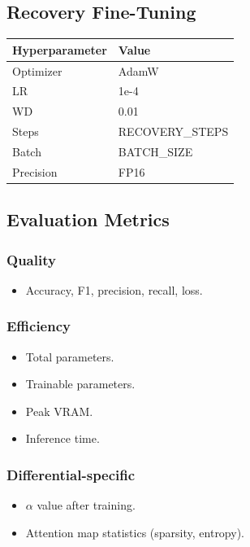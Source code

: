 \subsection{Recovery Fine-Tuning}

\begin{table}[H]
\centering
\small
\begin{tabular}{ll}
\toprule
\textbf{Hyperparameter} & \textbf{Value} \\
\midrule
Optimizer & AdamW \\
LR & 1e-4 \\
WD & 0.01 \\
Steps & {{RECOVERY\_STEPS}} \\
Batch & {{BATCH\_SIZE}} \\
Precision & FP16 \\
\bottomrule
\end{tabular}
\end{table}

\subsection{Evaluation Metrics}

\subsubsection{Quality}
\begin{itemize}
\item Accuracy, F1, precision, recall, loss.

\end{itemize}
\subsubsection{Efficiency}
\begin{itemize}
\item Total parameters.
\item Trainable parameters.
\item Peak VRAM.
\item Inference time.

\end{itemize}
\subsubsection{Differential-specific}
\begin{itemize}
\item $\alpha$ value after training.
\item Attention map statistics (sparsity, entropy).

\end{itemize}

